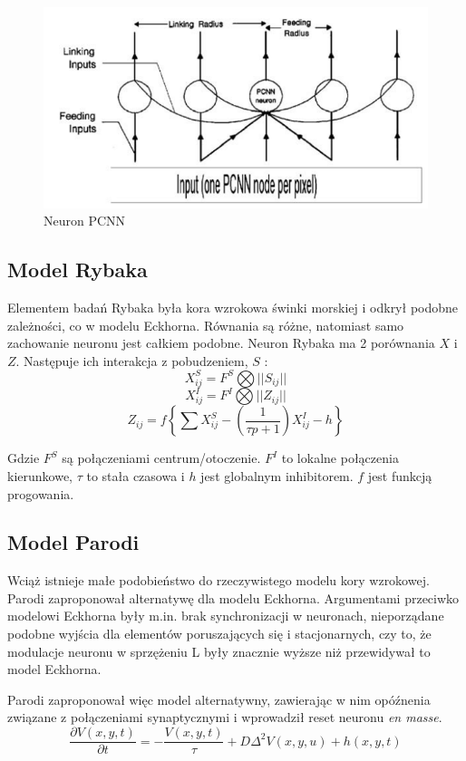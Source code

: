 \begin{figure}[ht]
	\centering
	\includegraphics[width=\textwidth*4/5]{../PCNN.png}
	\caption{Neuron PCNN} \label{fig:PCNNNeuron}
\end{figure}
\subsection{Model Rybaka}
Elementem badań Rybaka była kora wzrokowa świnki morskiej i odkrył podobne zależności, co w modelu Eckhorna.
Równania są różne, natomiast samo zachowanie neuronu jest całkiem podobne.
Neuron Rybaka ma 2 porównania $X$ i $Z$. 
Następuje ich interakcja z pobudzeniem, $S$ : 
$$X_{ij}^S=F^S\bigotimes||S_{ij}||$$
$$X_{ij}^I=F^I\bigotimes||Z_{ij}||$$
$$Z_{ij}=f\left\{\sum X_{ij}^S - \left( \frac{1}{\tau p+1} \right) X_{ij}^I -h \right\}$$

Gdzie $F^S$ są połączeniami centrum/otoczenie.
$F^I$ to lokalne połączenia kierunkowe, $\tau$ to stała czasowa i $h$ jest globalnym inhibitorem.
$f{}$ jest funkcją progowania.
\subsection{Model Parodi}
Wciąż istnieje małe podobieństwo do rzeczywistego modelu kory wzrokowej.
Parodi zaproponował alternatywę dla modelu Eckhorna. 
Argumentami przeciwko modelowi Eckhorna były m.in. brak synchronizacji w neuronach,
nieporządane podobne wyjścia dla elementów poruszających się i stacjonarnych, 
czy to, że modulacje neuronu w sprzężeniu L były znacznie wyższe niż przewidywał to model Eckhorna.

Parodi zaproponował więc model alternatywny, zawierając w nim opóźnenia związane z połączeniami synaptycznymi
i wprowadził reset neuronu \textit{en masse}.
$$\frac{\partial V(x,y,t)}{\partial t} = - \frac{V(x,y,t)}{\tau} 
+ D\Delta ^2V(x,y,u)+h(x,y,t)$$

